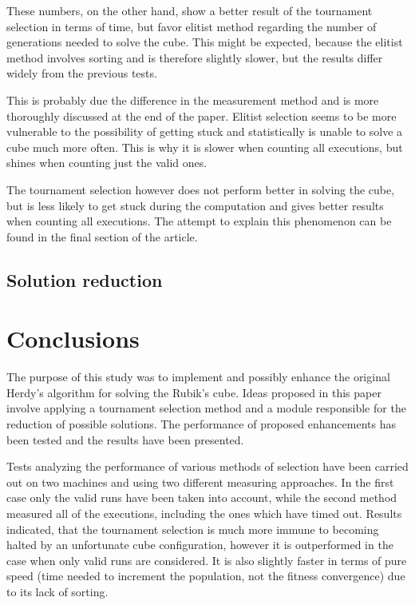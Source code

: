 \documentclass[a4paper]{article}
\begin{document}
These numbers, on the other hand, show a better result of the tournament selection in terms of time, but favor elitist method regarding the number of generations needed to solve the cube. This might be expected, because the elitist method involves sorting and is therefore slightly slower, but the results differ widely from the previous tests.

This is probably due the difference in the measurement method and is more thoroughly discussed at the end of the paper. Elitist selection seems to be more vulnerable to the possibility of getting stuck and statistically is unable to solve a cube much more often. This is why it is slower when counting all executions, but shines when counting just the valid ones.

The tournament selection however does not perform better in solving the cube, but is less likely to get stuck during the computation and gives better results when counting all executions. The attempt to explain this phenomenon can be found in the final section of the article.

\subsection{Solution reduction}


\section{Conclusions}

The purpose of this study was to implement and possibly enhance the original Herdy's algorithm for solving the Rubik's cube. Ideas proposed in this paper involve applying a tournament selection method and a module responsible for the reduction of possible solutions. The performance of proposed enhancements has been tested and the results have been presented.

Tests analyzing the performance of various methods of selection have been carried out on two machines and using two different measuring approaches. In the first case only the valid runs have been taken into account, while the second method measured all of the executions, including the ones which have timed out. Results indicated, that the tournament selection is much more immune to becoming halted by an unfortunate cube configuration, however it is outperformed in the case when only valid runs are considered. It is also slightly faster in terms of pure speed (time needed to increment the population, not the fitness convergence) due to its lack of sorting.
\end{document}
